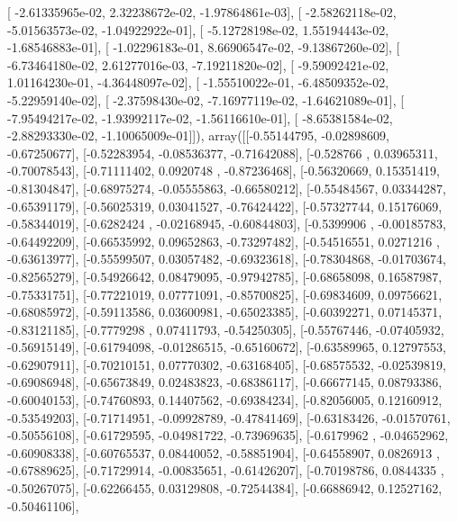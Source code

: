 \documentclass{article}
\begin{document}
       [ -2.61335965e-02,   2.32238672e-02,  -1.97864861e-03],
       [ -2.58262118e-02,  -5.01563573e-02,  -1.04922922e-01],
       [ -5.12728198e-02,   1.55194443e-02,  -1.68546883e-01],
       [ -1.02296183e-01,   8.66906547e-02,  -9.13867260e-02],
       [ -6.73464180e-02,   2.61277016e-03,  -7.19211820e-02],
       [ -9.59092421e-02,   1.01164230e-01,  -4.36448097e-02],
       [ -1.55510022e-01,  -6.48509352e-02,  -5.22959140e-02],
       [ -2.37598430e-02,  -7.16977119e-02,  -1.64621089e-01],
       [ -7.95494217e-02,  -1.93992117e-02,  -1.56116610e-01],
       [ -8.65381584e-02,  -2.88293330e-02,  -1.10065009e-01]]), array([[-0.55144795, -0.02898609, -0.67250677],
       [-0.52283954, -0.08536377, -0.71642088],
       [-0.528766  ,  0.03965311, -0.70078543],
       [-0.71111402,  0.0920748 , -0.87236468],
       [-0.56320669,  0.15351419, -0.81304847],
       [-0.68975274, -0.05555863, -0.66580212],
       [-0.55484567,  0.03344287, -0.65391179],
       [-0.56025319,  0.03041527, -0.76424422],
       [-0.57327744,  0.15176069, -0.58344019],
       [-0.6282424 , -0.02168945, -0.60844803],
       [-0.5399906 , -0.00185783, -0.64492209],
       [-0.66535992,  0.09652863, -0.73297482],
       [-0.54516551,  0.0271216 , -0.63613977],
       [-0.55599507,  0.03057482, -0.69323618],
       [-0.78304868, -0.01703674, -0.82565279],
       [-0.54926642,  0.08479095, -0.97942785],
       [-0.68658098,  0.16587987, -0.75331751],
       [-0.77221019,  0.07771091, -0.85700825],
       [-0.69834609,  0.09756621, -0.68085972],
       [-0.59113586,  0.03600981, -0.65023385],
       [-0.60392271,  0.07145371, -0.83121185],
       [-0.7779298 ,  0.07411793, -0.54250305],
       [-0.55767446, -0.07405932, -0.56915149],
       [-0.61794098, -0.01286515, -0.65160672],
       [-0.63589965,  0.12797553, -0.62907911],
       [-0.70210151,  0.07770302, -0.63168405],
       [-0.68575532, -0.02539819, -0.69086948],
       [-0.65673849,  0.02483823, -0.68386117],
       [-0.66677145,  0.08793386, -0.60040153],
       [-0.74760893,  0.14407562, -0.69384234],
       [-0.82056005,  0.12160912, -0.53549203],
       [-0.71714951, -0.09928789, -0.47841469],
       [-0.63183426, -0.01570761, -0.50556108],
       [-0.61729595, -0.04981722, -0.73969635],
       [-0.6179962 , -0.04652962, -0.60908338],
       [-0.60765537,  0.08440052, -0.58851904],
       [-0.64558907,  0.0826913 , -0.67889625],
       [-0.71729914, -0.00835651, -0.61426207],
       [-0.70198786,  0.0844335 , -0.50267075],
       [-0.62266455,  0.03129808, -0.72544384],
       [-0.66886942,  0.12527162, -0.50461106],
\end{document}
